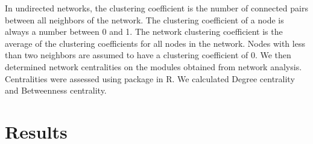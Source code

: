 \documentclass[a4paper]{article}
\begin{document}
In undirected networks, the clustering coefficient is the number of connected pairs between all neighbors of the network. The clustering coefficient of a node is always a number between 0 and 1. The network clustering coefficient is the average of the clustering coefficients for all nodes in the network. Nodes with less than two neighbors are assumed to have a clustering coefficient of 0. We then determined network centralities on the modules obtained from network analysis. Centralities were assessed using package in R. We calculated Degree centrality and Betweenness centrality.

\section{Results}



\end{document}
